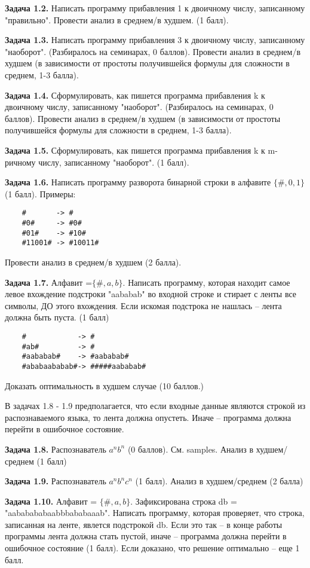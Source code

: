\documentclass[a4paper, 10pt]{extarticle}
\newcommand{\Task}[1]{\textbf{Задача #1.}}
\begin{document}
\Task{1.2} Написать программу прибавления 1 к двоичному числу, записанному "правильно".
Провести анализ в среднем/в худшем. (1 балл).

\Task{1.3} Написать программу прибавления 3 к двоичному числу, записанному "наоборот". (Разбиралось на семинарах, 0 баллов).
Провести анализ в среднем/в худшем (в зависимости от простоты получившейся формулы для сложности в среднем, 1-3 балла).

\Task{1.4} Сформулировать, как пишется программа прибавления k к двоичному числу, записанному "наоборот". (Разбиралось на семинарах, 0 баллов).
Провести анализ в среднем/в худшем (в зависимости от простоты получившейся формулы для сложности в среднем, 1-3 балла).

\Task{1.5} Сформулировать, как пишется программа прибавления k к m-ричному числу, записанному "наоборот". (1 балл).

\Task{1.6} Написать программу разворота бинарной строки в алфавите $\{ \#, 0, 1\}$ (1 балл). Примеры:
\begin{verbatim}
    #       -> #
    #0#     -> #0#
    #01#    -> #10#
    #11001# -> #10011# 
\end{verbatim}
Провести анализ в среднем/в худшем (2 балла).

\Task{1.7} Алфавит =$\{\#, a, b\}$. Написать программу, которая находит самое левое вхождение подстроки "aababab" во входной строке и 
стирает с ленты все символы, ДО этого вхождения. Если искомая подстрока не нашлась -- лента должна быть пуста. (1 балл)
\begin{verbatim}
    #            -> #
    #ab#         -> #
    #aababab#    -> #aababab#
    #ababaababab#-> #####aababab#
\end{verbatim}
Доказать оптимальность в худшем случае (10 баллов.)


В задачах 1.8 - 1.9 предполагается, что если входные данные являются строкой из распознаваемого языка, то лента должна опустеть. 
Иначе -- программа должна перейти в ошибочное состояние.

\Task{1.8} Распознаватель $a^n b^n$ (0 баллов). См. samples.
Анализ в худшем/среднем (1 балл)

\Task{1.9} Распознаватель $a^n b^n c^n$ (1 балл).
Анализ в худшем/среднем (2 балла)

\Task{1.10} Алфавит = $\{\#, a, b\}$. Зафиксирована строка db = "aababababaabbbababaaab". 
Написать программу, которая проверяет, что строка, записанная на ленте, явлется подстрокой db. Если это так -- 
в конце работы программы лента должна стать пустой, иначе -- программа должна перейти в ошибочное состояние (1 балл). 
Если доказано, что решение оптимально -- еще 1 балл.
\end{document}
